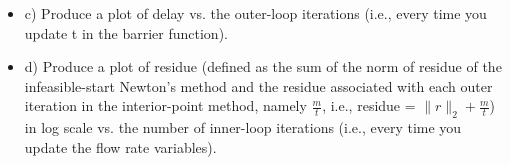 \documentclass[12pt,letter]{article}
\newcommand{\norm}[1]{\|#1\|}
\begin{document}
\begin{enumerate}
\begin{itemize}
    
    
    \pagebreak
  \item c) Produce a plot of delay vs. the outer-loop iterations (i.e., every time you update t in the barrier function).
    \pagebreak
  \item d) Produce a plot of residue (defined as the sum of the norm of residue of the infeasible-start Newton’s method and the residue associated with each outer iteration in the interior-point method, namely $\frac{m}{t}$, i.e., residue = $\norm{r}_2 + \frac{m}{t}$) in log scale vs. the number of inner-loop iterations (i.e., every time you update the flow rate variables).
  \end{itemize}
\end{enumerate}
\end{document}
